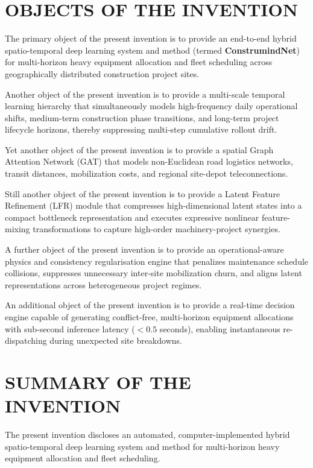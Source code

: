 \documentclass[11pt,a4paper]{article}
\begin{document}
\section{OBJECTS OF THE INVENTION}
\noindent The primary object of the present invention is to provide an end-to-end hybrid spatio-temporal deep learning system and method (termed \textbf{ConstrumindNet}) for multi-horizon heavy equipment allocation and fleet scheduling across geographically distributed construction project sites.

\noindent Another object of the present invention is to provide a multi-scale temporal learning hierarchy that simultaneously models high-frequency daily operational shifts, medium-term construction phase transitions, and long-term project lifecycle horizons, thereby suppressing multi-step cumulative rollout drift.

\noindent Yet another object of the present invention is to provide a spatial Graph Attention Network (GAT) that models non-Euclidean road logistics networks, transit distances, mobilization costs, and regional site-depot teleconnections.

\noindent Still another object of the present invention is to provide a Latent Feature Refinement (LFR) module that compresses high-dimensional latent states into a compact bottleneck representation and executes expressive nonlinear feature-mixing transformations to capture high-order machinery-project synergies.

\noindent A further object of the present invention is to provide an operational-aware physics and consistency regularisation engine that penalizes maintenance schedule collisions, suppresses unnecessary inter-site mobilization churn, and aligns latent representations across heterogeneous project regimes.

\noindent An additional object of the present invention is to provide a real-time decision engine capable of generating conflict-free, multi-horizon equipment allocations with sub-second inference latency ($<0.5$ seconds), enabling instantaneous re-dispatching during unexpected site breakdowns.

\section{SUMMARY OF THE INVENTION}
\noindent The present invention discloses an automated, computer-implemented hybrid spatio-temporal deep learning system and method for multi-horizon heavy equipment allocation and fleet scheduling. 
\end{document}
